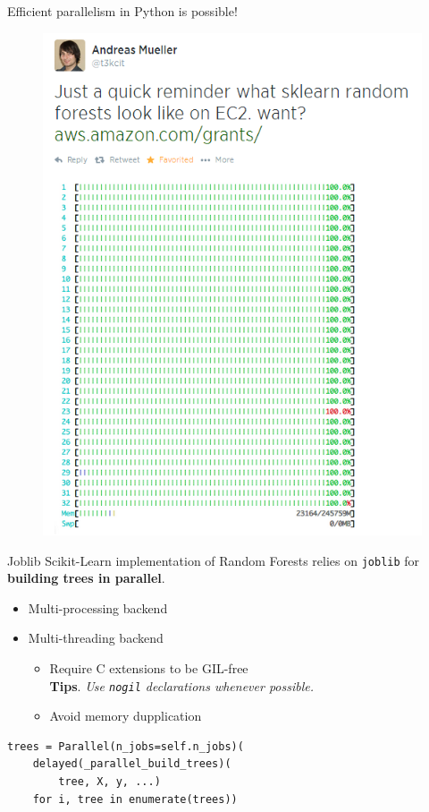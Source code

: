 \documentclass{beamer}
\begin{document}
\begin{frame}{Efficient parallelism in Python is possible!}
  \begin{figure}
  \includegraphics[scale=0.45]{./figures/parallel.png}
  \end{figure}
\end{frame}

\begin{frame}[fragile]{Joblib}
Scikit-Learn implementation of Random Forests relies on \texttt{joblib} for {\bf building trees in parallel}.
\begin{itemize}
  \item Multi-processing backend
  \item Multi-threading backend
    \begin{itemize}
      \item Require C extensions to be GIL-free \\
        {\bf Tips}. \textit{Use \texttt{nogil} declarations whenever possible.}
      \item Avoid memory dupplication
    \end{itemize}
\end{itemize}

\hspace{0.5cm}

\begin{verbatim}
trees = Parallel(n_jobs=self.n_jobs)(
    delayed(_parallel_build_trees)(
        tree, X, y, ...)
    for i, tree in enumerate(trees))
\end{verbatim}

\end{frame}
\end{document}
